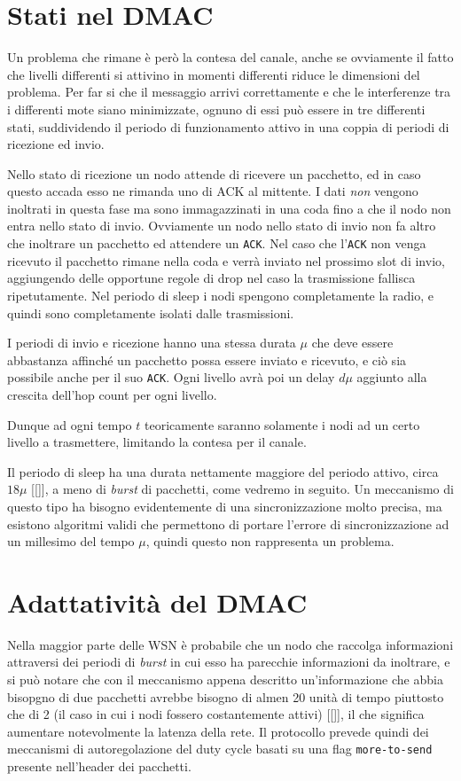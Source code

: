 \documentclass[pdftex,12pt,a4paper,italian,openany]{book}
\begin{document}
\section{Stati nel DMAC}
Un problema che rimane è però la contesa del canale, anche se ovviamente il fatto che livelli 
differenti si attivino in momenti differenti riduce le dimensioni del problema.
Per far si che il messaggio arrivi correttamente e che le interferenze tra i differenti 
mote siano minimizzate, ognuno di essi può essere in tre differenti stati, suddividendo il 
periodo di funzionamento attivo in una coppia di periodi di ricezione ed invio. 

Nello stato di ricezione un nodo attende di ricevere un pacchetto, ed in caso questo accada 
esso ne rimanda uno di ACK al mittente. I dati \emph{non} vengono inoltrati in questa fase ma 
sono immagazzinati in una coda fino a che il nodo non entra nello stato di invio.
Ovviamente un nodo nello stato di invio non fa altro che inoltrare un pacchetto ed attendere un 
\texttt{ACK}. Nel caso che l'\texttt{ACK}  non venga ricevuto il pacchetto rimane nella coda e 
verrà inviato nel prossimo slot di invio, aggiungendo delle opportune regole di drop nel caso 
la trasmissione fallisca ripetutamente. 
Nel periodo di sleep i nodi spengono completamente la radio, e quindi sono completamente isolati dalle trasmissioni. 

I periodi di invio e ricezione hanno una stessa durata $\mu$ che deve essere abbastanza affinché 
un pacchetto possa essere inviato e ricevuto, e ciò sia possibile anche per il suo \texttt{ACK}.
Ogni livello avrà poi un delay $d\mu$ aggiunto alla crescita dell'hop count per ogni livello. 
 
Dunque ad ogni tempo $t$ teoricamente saranno solamente i nodi ad un certo livello a 
trasmettere, limitando la contesa per il canale. 

Il periodo di sleep ha una durata nettamente maggiore del periodo attivo, circa $18\mu$ [[]], a meno di \emph{burst} di pacchetti, come vedremo in seguito.
Un meccanismo di questo tipo ha bisogno evidentemente di una sincronizzazione molto precisa, ma 
esistono algoritmi validi che permettono di portare l'errore di sincronizzazione ad un millesimo 
del tempo $\mu$, quindi questo non rappresenta un problema. 

\section{Adattatività del DMAC}
Nella maggior parte delle WSN è probabile che un nodo che raccolga informazioni attraversi dei
periodi di \emph{burst} in cui esso ha parecchie informazioni da inoltrare, e si può notare che 
con il meccanismo appena descritto un'informazione che abbia bisopgno di due pacchetti avrebbe 
bisogno di almen 20 unità di tempo piuttosto che di 2 (il caso in cui i nodi fossero 
costantemente attivi) [[]], il che significa aumentare notevolmente la latenza della rete. 
Il protocollo prevede quindi dei meccanismi di autoregolazione del duty cycle basati su una flag 
\texttt{more-to-send} presente nell'header dei pacchetti.
\end{document}
